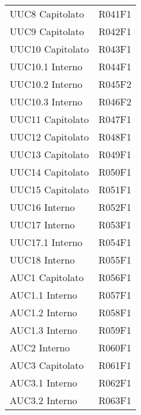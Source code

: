 \documentclass[../analisi-dei-requisiti.tex]{subfiles}
\begin{document}
\begin{longtable}[H]{ p{4cm} | p{4cm} }
  UUC8 Capitolato               & R041F1                               \\
  UUC9 Capitolato               & R042F1                               \\
  UUC10 Capitolato              & R043F1                               \\
  UUC10.1 Interno               & R044F1                               \\
  UUC10.2 Interno               & R045F2                               \\
  UUC10.3 Interno               & R046F2                               \\
  UUC11 Capitolato              & R047F1                               \\
  UUC12 Capitolato              & R048F1                               \\
  UUC13 Capitolato              & R049F1                               \\
  UUC14 Capitolato              & R050F1                               \\
  UUC15 Capitolato              & R051F1                               \\
  UUC16 Interno                 & R052F1                               \\
  UUC17 Interno                 & R053F1                               \\
  UUC17.1 Interno               & R054F1                               \\
  UUC18 Interno                 & R055F1                               \\
  AUC1 Capitolato               & R056F1                               \\
  AUC1.1 Interno                & R057F1                               \\
  AUC1.2 Interno                & R058F1                               \\
  AUC1.3 Interno                & R059F1                               \\
  AUC2 Interno                  & R060F1                               \\
  AUC3 Capitolato               & R061F1                               \\
  AUC3.1 Interno                & R062F1                               \\
  AUC3.2 Interno                & R063F1                               \\

\end{longtable}
\end{document}
